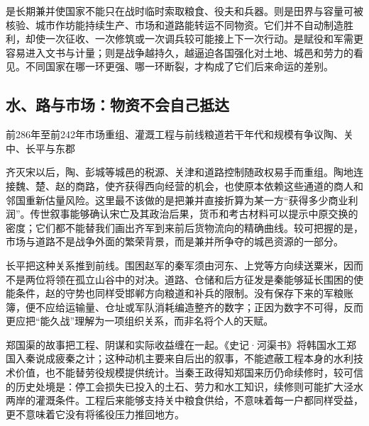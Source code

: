 \begin{causalchain}
是长期兼并使国家不能只在战时临时索取粮食、役夫和兵器。则是田界与容量可被核验、城市作坊能持续生产、市场和道路能转运不同物资。它们并不自动制造胜利，却使一次征收、一次修筑或一次调兵较可能接上下一次行动。是赋役和军需更容易进入文书与计量；则是战争越持久，越逼迫各国强化对土地、城邑和劳力的看见。不同国家在哪一环更强、哪一环断裂，才构成了它们后来命运的差别。
\end{causalchain}

\subsection{水、路与市场：物资不会自己抵达}

\begin{event}{前286年至前242年}{市场重组、灌溉工程与前线粮道}{若干年代和规模有争议}{陶、关中、长平与东郡}

齐灭宋以后，陶、彭城等城邑的税源、关津和道路控制随政权易手而重组。陶地连接魏、楚、赵的商路，使齐获得西向经营的机会，也使原本依赖这些通道的商人和邻国重新估量风险。这里最不该做的是把兼并直接折算为某一方“获得多少商业利润”。传世叙事能够确认宋亡及其政治后果，货币和考古材料可以提示中原交换的密度；它们都不能替我们画出齐军到来前后货物流向的精确曲线。较可把握的是，市场与道路不是战争外面的繁荣背景，而是兼并所争夺的城邑资源的一部分。

长平把这种关系推到前线。围困赵军的秦军须由河东、上党等方向续送粟米，因而不是两位将领在孤立山谷中的对决。道路、仓储和后方征发是秦能够延长围困的使能条件，赵的守势也同样受邯郸方向粮道和补兵的限制。没有保存下来的军粮账簿，便不应给运输量、仓址或军队消耗编造整齐的数字；正因为数字不可得，反而更应把“能久战”理解为一项组织关系，而非名将个人的天赋。

郑国渠的故事把工程、阴谋和实际收益缠在一起。《史记·河渠书》将韩国水工郑国入秦说成疲秦之计；这种动机主要来自后出的叙事，不能遮蔽工程本身的水利技术价值，也不能替劳役规模提供统计。当秦王政得知郑国来历仍命续修时，较可信的历史处境是：停工会损失已投入的土石、劳力和水工知识，续修则可能扩大泾水两岸的灌溉条件。工程后来能够支持关中粮食供给，不意味着每一户都同样受益，更不意味着它没有将徭役压力推回地方。


\end{event}
